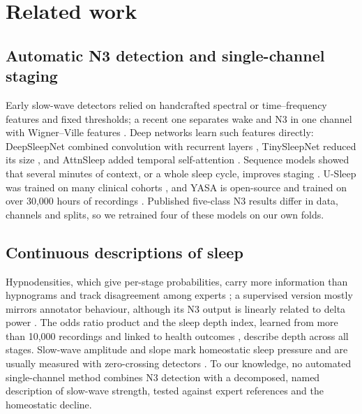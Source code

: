 \section{Related work}
\subsection{Automatic N3 detection and single-channel staging}
Early slow-wave detectors relied on handcrafted spectral or time--frequency features and fixed thresholds; a recent one separates wake and N3 in one channel with Wigner--Ville features \cite{yeh2024n3}. Deep networks learn such features directly: DeepSleepNet combined convolution with recurrent layers \cite{supratak2017deepsleepnet}, TinySleepNet reduced its size \cite{supratak2020tinysleepnet}, and AttnSleep added temporal self-attention \cite{eldele2021attnsleep}. Sequence models showed that several minutes of context, or a whole sleep cycle, improves staging \cite{phan2022sleeptransformer,phan2023lseqsleepnet,phan2022review}. U-Sleep was trained on many clinical cohorts \cite{perslev2021usleep}, and YASA is open-source and trained on over 30,000 hours of recordings \cite{vallat2021yasa}. Published five-class N3 results differ in data, channels and splits, so we retrained four of these models on our own folds.

\subsection{Continuous descriptions of sleep}
Hypnodensities, which give per-stage probabilities, carry more information than hypnograms \cite{stephansen2018hypnodensity} and track disagreement among experts \cite{bakker2023ambiguity}; a supervised version mostly mirrors annotator behaviour, although its N3 output is linearly related to delta power \cite{huijben2023hypnodensity}. The odds ratio product \cite{younes2015orp} and the sleep depth index, learned from more than 10,000 recordings and linked to health outcomes \cite{zhou2025sdi}, describe depth across all stages. Slow-wave amplitude and slope mark homeostatic sleep pressure \cite{riedner2007slowwaves,tononi2014plasticity} and are usually measured with zero-crossing detectors \cite{massimini2004travelling}. To our knowledge, no automated single-channel method combines N3 detection with a decomposed, named description of slow-wave strength, tested against expert references and the homeostatic decline.


